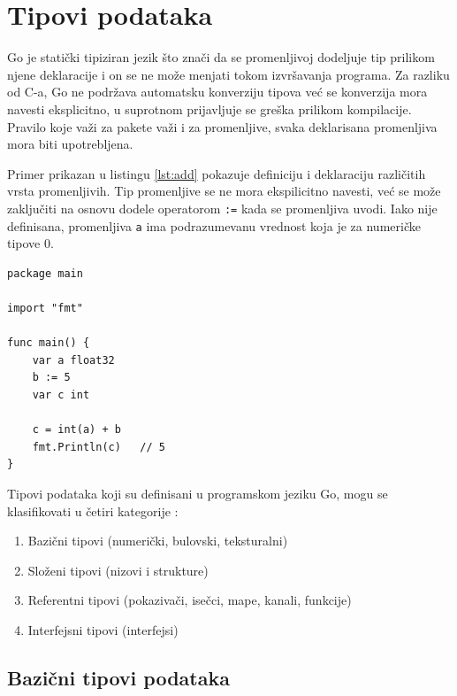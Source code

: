 \documentclass[12pt,oneside]{memoir}
\begin{document}
\section{Tipovi podataka}

Go je statički tipiziran jezik što znači da se promenljivoj dodeljuje tip prilikom njene deklaracije i on se ne može menjati tokom izvršavanja programa. Za razliku od C-a, Go ne podržava automatsku konverziju tipova već se konverzija mora navesti eksplicitno, u suprotnom prijavljuje se greška prilikom kompilacije. Pravilo koje važi za pakete važi i za promenljive, svaka deklarisana promenljiva mora biti upotrebljena.

Primer prikazan u listingu \ref{lst:add} pokazuje definiciju i deklaraciju različitih vrsta promenljivih. Tip promenljive se ne mora ekspilicitno navesti, već se može zaključiti na osnovu dodele operatorom \texttt{:=} kada se promenljiva uvodi. Iako nije definisana, promenljiva \texttt{a} ima podrazumevanu vrednost koja je za numeričke tipove 0.

\begin{center}
\begin{lstlisting}[caption=Primer programa koji ilustruje rad sa promenljivama, label={lst:add},  backgroundcolor=\color{background}]
package main

import "fmt"

func main() {
	var a float32
	b := 5
	var c int

	c = int(a) + b
	fmt.Println(c)	 // 5
}
\end{lstlisting}
\end{center}

\newpage

Tipovi podataka koji su definisani u programskom jeziku Go, mogu se klasifikovati u četiri kategorije \cite{bookGoProg}: 
\begin{enumerate}
\item Bazični tipovi  (numerički, bulovski, teksturalni)
\item Složeni tipovi (nizovi i strukture)
\item Referentni tipovi (pokazivači, isečci, mape, kanali, funkcije)
\item Interfejsni tipovi (interfejsi)
\end{enumerate}


\subsection{Bazični tipovi podataka}
\end{document}

